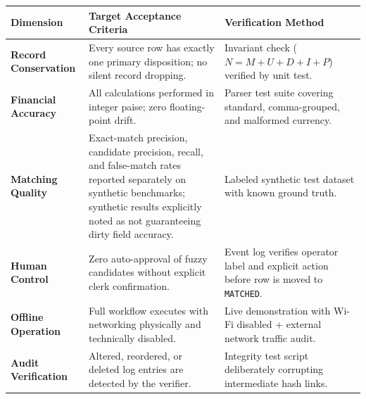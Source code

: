 \documentclass[11pt,a4paper]{article}
\newcommand{\code}[1]{\texttt{#1}}
\begin{document}
\vspace{0.15cm}
\noindent
\begin{tabularx}{\textwidth}{|l|Y|Y|}
\hline
\textbf{Dimension} & \textbf{Target Acceptance Criteria} & \textbf{Verification Method} \\
\hline
\textbf{Record Conservation} & Every source row has exactly one primary disposition; no silent record dropping. & Invariant check ($N = M + U + D + I + P$) verified by unit test. \\
\hline
\textbf{Financial Accuracy} & All calculations performed in integer paise; zero floating-point drift. & Parser test suite covering standard, comma-grouped, and malformed currency. \\
\hline
\textbf{Matching Quality} & Exact-match precision, candidate precision, recall, and false-match rates reported separately on synthetic benchmarks; synthetic results explicitly noted as not guaranteeing dirty field accuracy. & Labeled synthetic test dataset with known ground truth. \\
\hline
\textbf{Human Control} & Zero auto-approval of fuzzy candidates without explicit clerk confirmation. & Event log verifies operator label and explicit action before row is moved to \code{MATCHED}. \\
\hline
\textbf{Offline Operation} & Full workflow executes with networking physically and technically disabled. & Live demonstration with Wi-Fi disabled + external network traffic audit. \\
\hline
\textbf{Audit Verification} & Altered, reordered, or deleted log entries are detected by the verifier. & Integrity test script deliberately corrupting intermediate hash links. \\
\hline
\end{tabularx}
\end{document}

